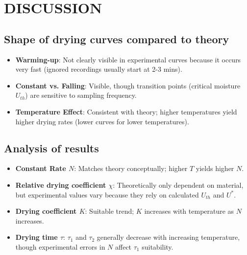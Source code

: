 \section{DISCUSSION}
\subsection{Shape of drying curves compared to theory}
\begin{itemize}
    \item \textbf{Warming-up}: Not clearly visible in experimental curves because it occurs very fast (ignored recordings usually start at 2-3 mins).
    \item \textbf{Constant vs. Falling}: Visible, though transition points (critical moisture $U_{th}$) are sensitive to sampling frequency.
    \item \textbf{Temperature Effect}: Consistent with theory; higher temperatures yield higher drying rates (lower curves for lower temperatures).
\end{itemize}

\subsection{Analysis of results}
\begin{itemize}
    \item \textbf{Constant Rate $N$}: Matches theory conceptually; higher $T$ yields higher $N$.
    \item \textbf{Relative drying coefficient $\chi$}: Theoretically only dependent on material, but experimental values vary because they rely on calculated $U_{th}$ and $U^*$.
    \item \textbf{Drying coefficient $K$}: Suitable trend; $K$ increases with temperature as $N$ increases.
    \item \textbf{Drying time $\tau$}: $\tau_1$ and $\tau_2$ generally decrease with increasing temperature, though experimental errors in $N$ affect $\tau_1$ suitability.
\end{itemize}

